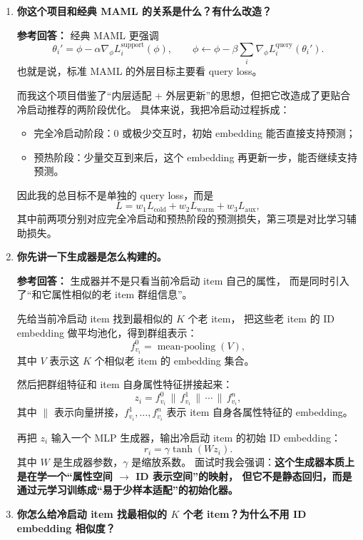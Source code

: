 \documentclass[11pt,a4paper]{ctexart}
\begin{document}
\begin{enumerate}[leftmargin=*, label=\textbf{Q\arabic*.}]
在我的项目里，我把“学习一个 item 的冷启动 ID embedding”看作一个任务。
也就是说，每个老 item 都可以构造成一个 task，
通过许多老 item 的任务训练，生成器学到一种跨 item 共享的能力：
\textbf{如何根据属性特征和少量交互，为新 item 快速给出一个适合推荐任务的初始嵌入。}

\item \textbf{你这个项目和经典 MAML 的关系是什么？有什么改造？}

\textbf{参考回答：}
经典 MAML 更强调
\[
\theta_i' = \phi - \alpha \nabla_{\phi} L^{\text{support}}_i(\phi),\qquad
\phi \leftarrow \phi - \beta \sum_i \nabla_{\phi} L_i^{\text{query}}(\theta_i').
\]
也就是说，标准 MAML 的外层目标主要看 query loss。

而我这个项目借鉴了“内层适配 + 外层更新”的思想，但把它改造成了更贴合冷启动推荐的两阶段优化。
具体来说，我把冷启动过程拆成：
\begin{itemize}
\item 完全冷启动阶段：0 或极少交互时，初始 embedding 能否直接支持预测；
\item 预热阶段：少量交互到来后，这个 embedding 再更新一步，能否继续支持预测。
\end{itemize}
因此我的总目标不是单独的 query loss，而是
\[
L = w_1 L_{\text{cold}} + w_2 L_{\text{warm}} + w_3 L_{\text{aux}},
\]
其中前两项分别对应完全冷启动和预热阶段的预测损失，第三项是对比学习辅助损失。

\item \textbf{你先讲一下生成器是怎么构建的。}

\textbf{参考回答：}
生成器并不是只看当前冷启动 item 自己的属性，
而是同时引入了“和它属性相似的老 item 群组信息”。

先给当前冷启动 item 找到最相似的 $K$ 个老 item，
把这些老 item 的 ID embedding 做平均池化，得到群组表示：
\[
f_{v_i}^{0} = \operatorname{mean\mbox{-}pooling}(V),
\]
其中 $V$ 表示这 $K$ 个相似老 item 的 embedding 集合。

然后把群组特征和 item 自身属性特征拼接起来：
\[
z_i = f_{v_i}^{0} \,\|\, f_{v_i}^{1} \,\|\, \cdots \,\|\, f_{v_i}^{n},
\]
其中 $\|$ 表示向量拼接，$f_{v_i}^{1},\dots,f_{v_i}^{n}$ 表示 item 自身各属性特征的 embedding。

再把 $z_i$ 输入一个 MLP 生成器，输出冷启动 item 的初始 ID embedding：
\[
r_i = \gamma \tanh(W z_i).
\]
其中 $W$ 是生成器参数，$\gamma$ 是缩放系数。
面试时我会强调：\textbf{这个生成器本质上是在学一个“属性空间 $\to$ ID 表示空间”的映射，
但它不是静态回归，而是通过元学习训练成“易于少样本适配”的初始化器。}

\item \textbf{你怎么给冷启动 item 找最相似的 $K$ 个老 item？为什么不用 ID embedding 相似度？}


\end{enumerate}
\end{document}
